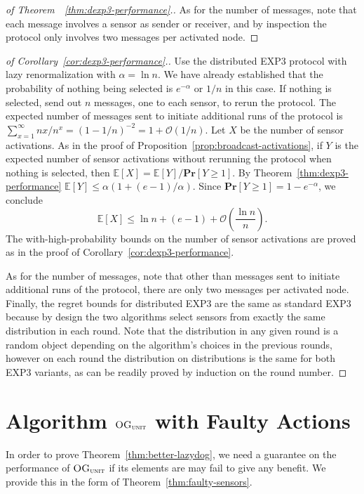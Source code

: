 \documentclass{sig-alternate-dan}
\numberwithin{equation}{section}
\newcommand{\algofont}[1]{\textsc{#1}}
\newcommand{\OGunit}{$\algofont{OG}_{\algofont{unit}}$\xspace}
\newcommand{\cO}{\mathcal{O}}
\newcommand{\EXPthree}{{\algofont{EXP3}}\xspace}
\newcommand{\paren} [1] {\ensuremath{ \left( {#1} \right) }}
\newcommand{\prob}[1]{\ensuremath{\mathbf{Pr}\left[#1\right] }}
\newcommand{\E}[1]{\ensuremath{\mathbb{E}\left[#1\right] }}
\begin{document}
{\begin{proof}[of Theorem~~\ref{thm:dexp3-performance}.]
As for the number of messages, note that each message involves a
sensor as sender or receiver, and by inspection the protocol only
involves two messages per activated node.
\end{proof}



\begin{proof}[of Corollary~\ref{cor:dexp3-performance}.]
Use the distributed \EXPthree protocol with lazy
renormalization with $\alpha = \ln n$.  We have already established
that the probability of nothing being selected is $e^{-\alpha}$ or
$1/n$ in this case.  If nothing is selected, send out $n$ messages,
one to each sensor, to rerun the protocol.  The expected number of
messages sent to initiate additional runs of the protocol is 
$\sum_{x=1}^{\infty} nx/n^{x} = \paren{1 - 1/n}^{-2} = 1 + \cO(1/n)$.
Let $X$ be the number of sensor activations.
As in the proof of
Proposition~\ref{prop:broadcast-activations}, if $Y$ is 
the expected number of sensor activations without rerunning the
protocol when nothing is selected, then 
$\E{X} = \E{Y}/\prob{Y \ge 1}$.  By
Theorem~\ref{thm:dexp3-performance} $\E{Y} \le  \alpha\paren{1 +
  (e-1)/\alpha}$.  Since $\prob{Y \ge 1} = 1 - e^{-\alpha}$, we 
conclude 
\[
\E{X} \le \ln n + (e-1) + \cO\paren{\frac{\ln n}{n}}\mbox{.}
\]
The with-high-probability bounds on the number of sensor activations
are proved as in 
the proof of Corollary~\ref{cor:dexp3-performance}.

As for the number of messages, note that other than 
messages sent to initiate additional runs of the protocol, there are
only two messages per activated node.  Finally, the regret bounds for
distributed \EXPthree are the same as standard \EXPthree because by
design the two algorithms select sensors from exactly the same distribution in each
round.  Note that the distribution in any given round is a random
object depending on the algorithm's choices in the previous rounds,
however on each round the distribution on distributions is the same for both \EXPthree
variants, as can be readily proved by induction on the round number. 
\end{proof}





%
%
%
\section{Algorithm \OGunit with Faulty Actions} \label{sec:faulty}
%

In order to prove Theorem~\ref{thm:better-lazydog}, we need a
guarantee on the performance of \OGunit if its elements are may fail
to give any benefit.  We provide this in the form of
Theorem~\ref{thm:faulty-sensors}.


}
\end{document}
